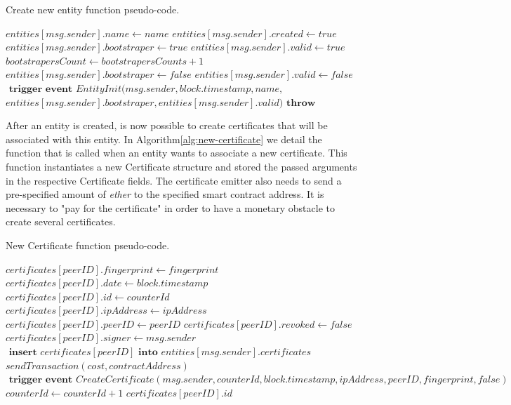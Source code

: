 \begin{algorithm}
  \caption{Create new entity function pseudo-code.}
  \label{alg:create-entity}
  \begin{algorithmic}[1]
        \State $entities[msg.sender].name \gets name$
        \State $entities[msg.sender].created \gets true$
        \State
          \State $entities[msg.sender].bootstraper \gets  true$
          \State $entities[msg.sender].valid \gets true$
          \State $bootstrapersCount \gets bootstrapersCounts + 1$
        \Else
          \State $entities[msg.sender].bootstraper \gets  false$
          \State $entities[msg.sender].valid \gets false$
        \EndIf
          \State
          \State $\textbf{ trigger event } EntityInit(msg.sender, block.timestamp, name,$
          \State $entities[msg.sender].bootstraper, entities[msg.sender].valid)$
      \Else
        \State $\textbf{throw}$
      \EndIf
    \EndFunction
  \end{algorithmic}
\end{algorithm}


After an entity is created, is now possible to create certificates that will be associated with this entity.
In Algorithm\ref{alg:new-certificate} we detail the function that is called when an entity wants to associate a new certificate.
This function instantiates a new Certificate structure and stored the passed arguments in the respective Certificate fields.
The certificate emitter also needs to send a pre-specified amount of \textit{ether} to the specified smart contract address.
It is necessary to "pay for the certificate" in order to have a monetary obstacle to create several certificates.

\begin{algorithm}
  \caption{New Certificate function pseudo-code.}
\label{alg:new-certificate}
  \begin{algorithmic}[1]
      \State $certificates[peerID].fingerprint \gets fingerprint$
      \State $certificates[peerID].date \gets block.timestamp$
      \State $certificates[peerID].id \gets counterId$
      \State $certificates[peerID].ipAddress \gets ipAddress$
      \State $certificates[peerID].peerID \gets peerID$
      \State $certificates[peerID].revoked \gets false$
      \State $certificates[peerID].signer \gets msg.sender$
      \State 
      \State $\textbf{ insert } certificates[peerID] \textbf{ into } entities[msg.sender].certificates$
      \State $sendTransaction(cost, contractAddress)$ 
      \State 
      \State $\textbf{ trigger event } CreateCertificate(msg.sender, counterId, block.timestamp,\allowbreak ipAddress, peerID, fingerprint, false)$
      \State
      \State $counterId \gets counterId + 1$
      \State 
      \State 
      \Return $certificates[peerID].id$
    \EndFunction
  \end{algorithmic}
\end{algorithm}


